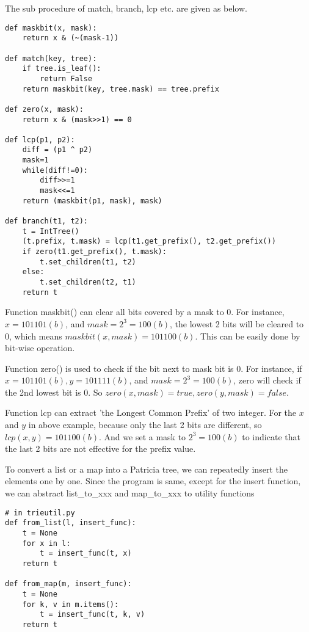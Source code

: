\documentclass{article}
\begin{document}
The sub procedure of match, branch, lcp etc. are given as below.

\begin{lstlisting}
def maskbit(x, mask):
    return x & (~(mask-1))

def match(key, tree):
    if tree.is_leaf():
        return False
    return maskbit(key, tree.mask) == tree.prefix

def zero(x, mask):
    return x & (mask>>1) == 0

def lcp(p1, p2):
    diff = (p1 ^ p2)
    mask=1
    while(diff!=0):
        diff>>=1
        mask<<=1
    return (maskbit(p1, mask), mask)

def branch(t1, t2):
    t = IntTree()
    (t.prefix, t.mask) = lcp(t1.get_prefix(), t2.get_prefix())
    if zero(t1.get_prefix(), t.mask):
        t.set_children(t1, t2)
    else:
        t.set_children(t2, t1)
    return t
\end{lstlisting}

Function maskbit() can clear all bits covered by a mask to 0. For instance,
$x = 101101(b)$, and $mask = 2^3 = 100(b)$, the lowest 2 bits will be cleared to 0,
which means $maskbit(x, mask) = 101100(b)$. This can be easily done by bit-wise
operation.

Function zero() is used to check if the bit next to mask bit is 0. For instance,
if $x = 101101(b), y = 101111(b)$, and $mask = 2^3 = 100(b)$, zero will check
if the 2nd lowest bit is 0. So $zero(x, mask) = true, zero(y, mask) = false$.

Function lcp can extract 'the Longest Common Prefix' of two integer. For the $x$
and $y$ in above example, because only the last 2 bits are different, so
$lcp(x, y) = 101100(b)$. And we set a mask to $2^3 = 100(b)$ to indicate that
the last 2 bits are not effective for the prefix value.

To convert a list or a map into a Patricia tree, we can repeatedly
insert the elements one by one. Since the program is same, except for
the insert function, we can abstract list\_to\_xxx and map\_to\_xxx to
utility functions

\begin{lstlisting}
# in trieutil.py
def from_list(l, insert_func):
    t = None
    for x in l:
        t = insert_func(t, x)
    return t

def from_map(m, insert_func):
    t = None
    for k, v in m.items():
        t = insert_func(t, k, v)
    return t
\end{lstlisting}
\end{document}
